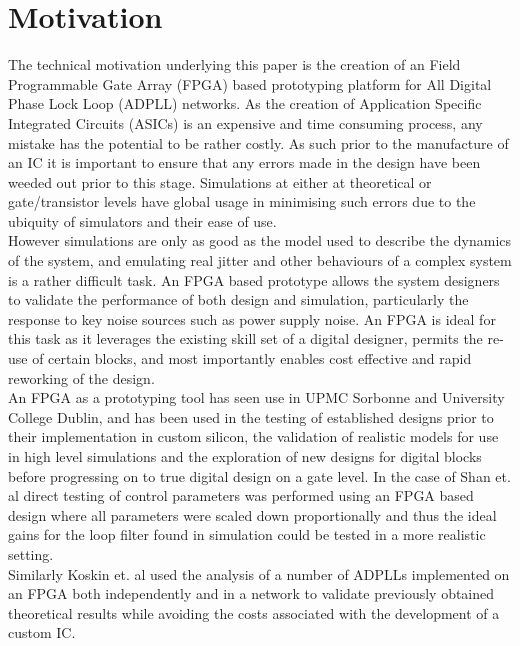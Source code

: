 \documentclass[conference]{IEEEtran}
\begin{document}
\section{Motivation}
The technical motivation underlying this paper is the creation of an Field Programmable Gate Array (FPGA) based prototyping platform for All Digital Phase Lock Loop (ADPLL) networks. As the creation of Application Specific Integrated Circuits (ASICs) is an expensive and time consuming process, any mistake has the potential to be rather costly. As such prior to the manufacture of an IC it is important to ensure that any errors made in the design have been weeded out prior to this stage.
Simulations at either at theoretical or gate/transistor levels have global usage in minimising such errors due to the ubiquity of simulators and their ease of use.\\
However simulations are only as good as the model used to describe the dynamics of the system, and emulating real jitter and other behaviours of a complex system is a rather difficult task. %
An FPGA based prototype allows the system designers to validate the performance of both design and simulation, particularly the response to key noise sources such as power supply noise. An FPGA is ideal for this task as it leverages the existing skill set of a digital designer, permits the re-use of certain blocks, and most importantly enables cost effective and rapid reworking of the design.\\
An FPGA as a prototyping tool has seen use in UPMC Sorbonne and University College Dublin, and has been used in the testing of established designs prior to their implementation in custom silicon\cite{zianbetov2013phd,shan2014phd}, the validation of realistic models for use in high level simulations\cite{theboys2019} and the exploration of new designs for digital blocks before progressing on to true digital design on a gate level.  %
In the case of Shan et. al \cite{shan2014phd} direct testing of control parameters was performed using an FPGA based design where all parameters were scaled down proportionally and thus the ideal gains for the loop filter found in simulation could be tested in a more realistic setting.\\
Similarly Koskin et. al \cite{theboys2019} used the analysis of a number of ADPLLs implemented on an FPGA both independently and in a network to validate previously obtained theoretical results while avoiding the costs associated with the development of a custom IC.\\
\end{document}
